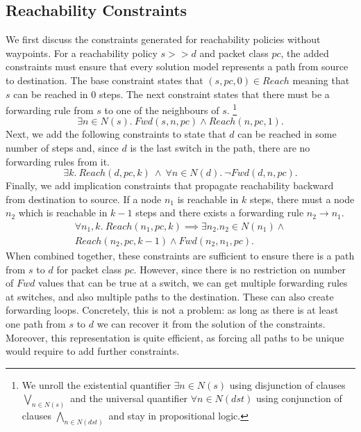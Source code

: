 \subsection{Reachability Constraints} \label{sec:reach}
We first discuss the constraints generated for reachability policies without waypoints.
For a reachability policy $s >> d$ and packet class $pc$, the added constraints must ensure that 
every solution model represents a path 
from source to destination. 
The base constraint states that $(s, pc,0) \in Reach$ meaning
that $s$ can be reached in $0$ steps. 
The next constraint states that there must be a forwarding rule from $s$ to one of
the neighbours of $s$.
\footnote{
	We unroll the existential quantifier $\exists n \in N(s)$ using disjunction of 
	clauses $\bigvee\limits_{n \in N(s)}$ and
	the universal quantifier $\forall n \in N(dst)$ using conjunction of clauses $\bigwedge\limits_{n \in N(dst)}$
	and stay in propositional logic.} 
\begin{equation} \label{eq:src}
	\exists n \in N(s).~Fwd(s, n, pc) \wedge Reach(n, pc, 1).
\end{equation}
Next, we add the following constraints to state that $d$ can be reached in some number of steps and,
since $d$ is the last switch in the path, there are no forwarding rules from it.
\begin{equation} \label{eq:dst}
	\exists k.~Reach(d, pc, k) \ \wedge \ \forall n \in N(d). \ \neg Fwd(d, n, pc).
\end{equation}
Finally, we add implication constraints that propagate reachability backward from destination to source. 
If a node $n_1$ is reachable in $k$ steps, there must a node $n_2$ which is reachable in  $k-1$ steps and there exists a forwarding rule $n_2 \rightarrow n_1$.
\begin{multline} \label{eq:bckprop}
\forall n_1,k.~ Reach(n_1,pc,k) \implies \exists n_2.  n_2 \in N(n_1) \wedge \\ Reach(n_2,pc,k-1) \wedge Fwd(n_2,n_1,pc).
\end{multline} 
When combined together, these constraints %
are sufficient to ensure there is a path from $s$ to $d$ for packet class $pc$.
However, since there is no restriction on number of $Fwd$ values that can be true at a switch, we can get multiple forwarding rules at switches, and 
also multiple paths to the destination. 
These can also create forwarding loops. 
Concretely, this is not a problem: as long as there is  at least one path from $s$ to $d$ we can recover it from the solution of the constraints. 
Moreover, this representation is quite efficient, as forcing all paths to be unique would
require to add further constraints.

